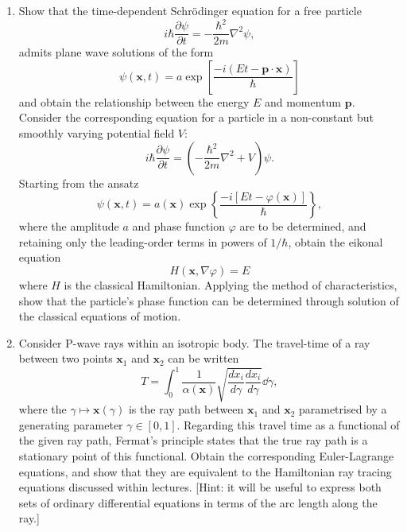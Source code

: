 \documentclass[a4paper,10pt]{paper}
\begin{document}
\begin{enumerate}
\item Show that the time-dependent Schrödinger equation for a free particle
\begin{equation*}
    i\hbar\frac{\partial\psi}{\partial t}=-\frac{\hbar^{2}}{2m}\nabla^{2}\psi,
\end{equation*}
admits plane wave solutions of the form
\begin{equation*}
    \psi(\mathbf{x},t)=a\exp\left[\frac{-i(E t-\mathbf{p}\cdot\mathbf{x})}{\hbar}\right]
\end{equation*}
and obtain the relationship between the energy $E$ and momentum $\mathbf{p}$. Consider the corresponding equation for a particle in a non-constant but smoothly varying potential field $V$:
\begin{equation*}
    i\hbar\frac{\partial\psi}{\partial t}=\left(-\frac{\hbar^{2}}{2m}\nabla^{2}+V\right)\psi.
\end{equation*}
Starting from the ansatz
\begin{equation*}
    \psi(\mathbf{x},t)=a(\mathbf{x})\exp\left\{\frac{-i[E t-\varphi(\mathbf{x})]}{\hbar}\right\},
\end{equation*}
where the amplitude $a$ and phase function $\varphi$ are to be determined, and retaining only the leading-order terms in powers of $1/\hbar$, obtain the eikonal equation
\begin{equation*}
    H(\mathbf{x},\nabla\varphi)=E
\end{equation*}
where $H$ is the classical Hamiltonian. Applying the method of characteristics, show that the particle's phase function can be determined through solution of the classical equations of motion.

\item Consider P-wave rays within an isotropic body. The travel-time of a ray between two points $\mathbf{x}_{1}$ and $\mathbf{x}_{2}$ can be written
\begin{equation*}
    T = \int_{0}^{1} \frac{1}{\alpha(\mathbf{x})} \sqrt{\frac{d x_{i}}{d\gamma}\frac{d x_{i}}{d\gamma}} \dd \gamma,
\end{equation*}
where the $\gamma\mapsto \mathbf{x}(\gamma)$ is the ray path between $\mathbf{x}_{1}$ and $\mathbf{x}_{2}$ parametrised by a generating parameter $\gamma\in[0,1]$. Regarding this travel time as a functional of the given ray path, Fermat's principle states that the true ray path is a stationary point of this functional. Obtain the corresponding Euler-Lagrange equations, and show that they are equivalent to the Hamiltonian ray tracing equations discussed within lectures. [Hint: it will be useful to express both sets of ordinary differential equations in terms of the arc length along the ray.]


\end{enumerate}
\end{document}
